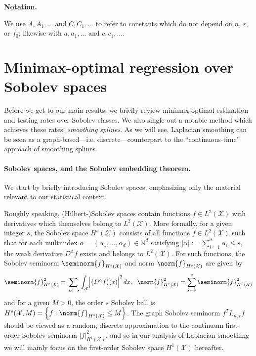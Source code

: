 \documentclass{article}
\newcommand{\abs}[1]{\left \lvert #1 \right \rvert}
\newcommand{\set}[1]{\left\{#1\right\}}
\newcommand{\1}{\mathbf{1}}
\newcommand{\Lap}{L}
\newcommand{\Xset}{\mathcal{X}}
\newcommand{\Leb}{L}
\theoremstyle{alden}
\theoremstyle{aldenthm}
\theoremstyle{definition}
\theoremstyle{remark}
\begin{document}
\textbf{Notation.}

We use $A,A_1, \ldots$ and $C,C_1, \ldots$ to refer to constants which do not depend on $n$, $r$, or $f_0$; likewise with $a, a_1,\ldots$ and $c, c_1,\ldots$.

\section{Minimax-optimal regression over Sobolev spaces}
\label{sec:minimax_optimal_regression_sobolev_spaces}

Before we get to our main results, we briefly review minimax optimal estimation and testing rates over Sobolev classes. We also single out a notable method which achieves these rates: \emph{smoothing splines}. As we will see, Laplacian smoothing can be seen as a graph-based---i.e. discrete---counterpart to the ``continuous-time'' approach of smoothing splines. 

\paragraph{Sobolev spaces, and the Sobolev embedding theorem.} We start by briefly introducing Sobolev spaces, emphasizing only the material relevant to our statistical context. 

Roughly speaking, (Hilbert-)Sobolev spaces contain functions $f \in \Leb^2(\Xset)$ with derivatives which themselves belong to $\Leb^2(\Xset)$. More formally, for a given integer $s$, the Sobolev space $H^{s}(\Xset)$ consists of all functions $f \in \Leb^2(\Xset)$ such that for each multiindex $\alpha = (\alpha_1,\ldots,\alpha_d) \in \mathbb{N}^d$ satisfying $\abs{\alpha} := \sum_{i = 1}^{d} \alpha_i \leq s$, the weak derivative $D^{\alpha}f$ exists and belongs to $\Leb^2(\Xset)$. For such functions, the Sobolev seminorm $\seminorm{f}_{H^{s}(\Xset)}$ and norm $\norm{f}_{H^{s}(\Xset)}$ are given by 
\begin{equation*}
\seminorm{f}_{H^s(\Xset)}^2 = \sum_{\abs{\alpha} = s}\int_{\mathcal{X}} \Bigl|\bigl(D^{\alpha}f\bigr)(x)\Bigr|^2 \,dx, ~~ \norm{f}_{H^{s}(\Xset)}^2 = \sum_{k = 0}^{s} \seminorm{f}_{H^k(\Xset)}^2
\end{equation*}
and for a given $M > 0$, the order $s$ Sobolev ball is $H^s(\Xset, M) = \set{f: \norm{f}_{H^s(\Xset)} \leq M}$. The graph Sobolev seminorm $f^T \Lap_{n,r} f$ should be viewed as a random, discrete approximation to the continuum first-order Sobolev seminorm $|f|_{H^1(\Xset)}^2$, and so in our analysis of Laplacian smoothing we will mainly focus on the first-order Sobolev space $H^1(\Xset)$ hereafter.
\end{document}
